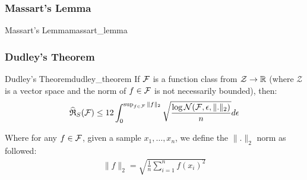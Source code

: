 \subsubsection{Massart's Lemma}
\begin{theorem}{Massart's Lemma}{massart_lemma}
    
\end{theorem}



\subsubsection{Dudley's Theorem}
\begin{theorem}{Dudley's Theorem}{dudley_theorem}
    If $\mathcal{F}$ is a function class from $\mathcal{Z}\to\mathbb{R}$ (where $\mathcal{Z}$ is a vector space and the norm of $f\in\mathcal{F}$ is not necessarily bounded), then:
    \begin{align*}
        \widehat{\mathfrak{R}}_S(\mathcal{F}) \le 12\int_0^{\sup_{f\in\mathcal{F}}\|f\|_2} \sqrt{
            \frac{\log \mathcal{N}(\mathcal{F}, \epsilon, \|.\|_2)}{n}
        }d\epsilon
    \end{align*}

    \noindent Where for any $f\in\mathcal{F}$, given a sample $x_1, \dots, x_n$, we define the $\|.\|_2$ norm as followed:
    \begin{align*}
        \|f\|_2 = \sqrt{
            \frac{1}{n}\sum_{i=1}^n f(x_i)^2
        }
    \end{align*}
\end{theorem}
